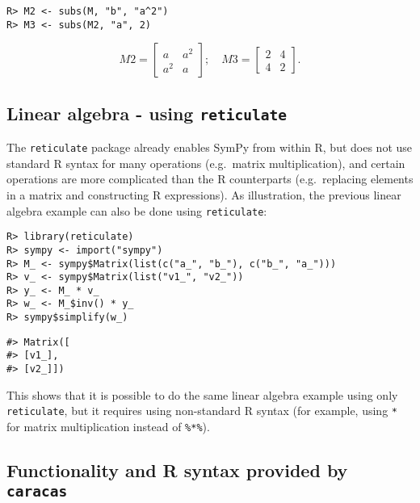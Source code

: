 \begin{verbatim}
R> M2 <- subs(M, "b", "a^2")
R> M3 <- subs(M2, "a", 2) 
\end{verbatim}

\begin{equation}
M2 = \left[\begin{matrix}a & a^{2}\\a^{2} & a\end{matrix}\right]; \quad
M3 = \left[\begin{matrix}2 & 4\\4 & 2\end{matrix}\right].
\end{equation}

\hypertarget{linear-algebra---using-reticulate}{%
\subsection{\texorpdfstring{Linear algebra - using \texttt{reticulate}}{Linear algebra - using reticulate}}\label{linear-algebra---using-reticulate}}

The \texttt{reticulate} package already enables SymPy from within R,
but does not use standard R syntax for many operations (e.g.~matrix multiplication),
and certain operations are more complicated than the R counterparts
(e.g.~replacing elements in a matrix and constructing R expressions).
As illustration, the previous linear algebra example can also be done using \texttt{reticulate}:

\begin{verbatim}
R> library(reticulate)
R> sympy <- import("sympy")
R> M_ <- sympy$Matrix(list(c("a_", "b_"), c("b_", "a_")))
R> v_ <- sympy$Matrix(list("v1_", "v2_"))
R> y_ <- M_ * v_
R> w_ <- M_$inv() * y_
R> sympy$simplify(w_)
\end{verbatim}

\begin{verbatim}
#> Matrix([
#> [v1_],
#> [v2_]])
\end{verbatim}

This shows that it is possible to do the same linear algebra example
using only \texttt{reticulate},
but it requires using non-standard R syntax (for
example, using \texttt{*} for matrix multiplication instead of \texttt{\%*\%}).

\hypertarget{functionality-and-r-syntax-provided-by-caracas}{%
\subsection{\texorpdfstring{Functionality and R syntax provided by \texttt{caracas}}{Functionality and R syntax provided by caracas}}\label{functionality-and-r-syntax-provided-by-caracas}}

